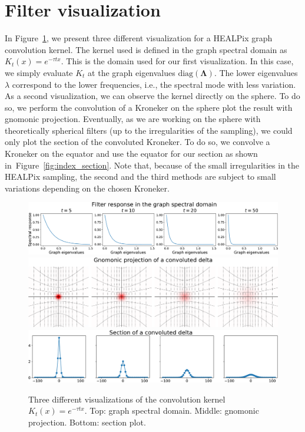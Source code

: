 \documentclass[final,twocolumn,3p,times,authoryear]{elsarticle}
\newcommand{\figref}[1]{Figure~\ref{fig:#1}}
\renewcommand{\b}[1]{{\bm{#1}}}   %
\newcommand{\1}{\b{1}}              %
\newcommand{\0}{\b{0}}              %
\newcommand{\bLambda}{\b{\Lambda}}
\begin{document}
\section{Filter visualization}
\label{sec:filter_visualization}

In \figref{gaussian_filters_visualization}, we present three different
visualization for a HEALPix graph convolution kernel. The kernel used is defined in the graph spectral domain as $K_t(x)=e^{-\tau t x}$. This is the domain used for our first visualization. In this case, we simply evaluate $K_t$
at the graph eigenvalues $\text{diag}(\bLambda)$. The lower eigenvalues $\lambda$ correspond to the lower frequencies, i.e., the spectral mode with less variation.
As a second visualization, we can observe the kernel directly on the sphere. To do so, we perform the convolution of a
Kroneker on the sphere plot the result with gnomonic projection. Eventually, as we are
working on the sphere with theoretically spherical filters (up to the irregularities of the sampling), we could only plot the section of the convoluted Kroneker. To do so, we convolve a Kroneker on the equator and use the equator for our section as shown in~\figref{index_section}. Note that, because of the small irregularities in the HEALPix
sampling, the second and the third methods are subject to small variations depending on the
chosen Kroneker.

\begin{figure}[!ht]
\centering
\includegraphics[width=\linewidth]{figures/gaussian_filters_spectral.pdf}
\includegraphics[width=\linewidth]{figures/gaussian_filters_gnomonic.pdf}
\includegraphics[width=\linewidth]{figures/gaussian_filters_section.pdf}
\caption{Three different visualizations of the convolution kernel $K_t(x)=e^{-\tau t x}$.
Top: graph spectral domain.
Middle: gnomonic projection.
Bottom: section plot.}
\label{fig:gaussian_filters_visualization}
\end{figure}
\end{document}
